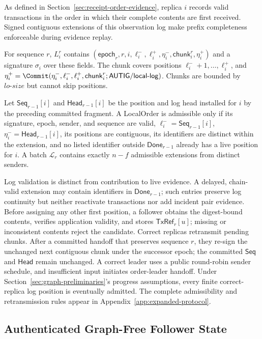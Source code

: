 As defined in Section~\ref{sec:receipt-order-evidence}, replica $i$ records valid transactions in the order in which their complete contents are first received. Signed contiguous extensions of this observation log make prefix completeness enforceable during evidence replay.

For sequence $r$, $L_i^r$ contains $(\mathsf{epoch}_r,r,i,\ell_i^{-},\ell_i^{+},\eta_i^{-},
\mathsf{chunk}_i^r,\eta_i^{+})$ and a signature $\sigma_i$ over these fields. The chunk covers positions $\ell_i^{-}+1,\ldots,\ell_i^{+}$, and $\eta_i^{+}=\Commit(\eta_i^{-},\ell_i^{-},\ell_i^{+}, \mathsf{chunk}_i^r;\mathsf{AUTIG/local\mbox{-}log})$. Chunks are bounded by $lo\text{-}size$ but cannot skip positions.

Let $\mathsf{Seq}_{r-1}[i]$ and $\mathsf{Head}_{r-1}[i]$ be the position and log head installed for $i$ by the preceding committed fragment. A LocalOrder is admissible only if its signature, epoch, sender, and sequence are valid, $\ell_i^{-}=\mathsf{Seq}_{r-1}[i]$, $\eta_i^{-}=\mathsf{Head}_{r-1}[i]$, its positions are contiguous, its identifiers are distinct within the extension, and no listed identifier outside $\mathsf{Done}_{r-1}$ already has a live position for $i$. A batch $\mathcal L_r$ contains exactly $n-f$ admissible extensions from distinct senders.

Log validation is distinct from contribution to live evidence.  A delayed, chain-valid extension may contain identifiers in $\mathsf{Done}_{r-1}$; such entries preserve log continuity but neither reactivate transactions nor add incident pair evidence. Before assigning any other first position, a follower obtains the digest-bound contents, verifies application validity, and stores $\mathsf{TxRef}_r[u]$; missing or inconsistent contents reject the candidate.
Correct replicas retransmit pending chunks.  After a committed handoff that preserves sequence $r$, they re-sign the unchanged next contiguous chunk under the successor epoch; the committed $\mathsf{Seq}$ and $\mathsf{Head}$ remain unchanged. A correct leader uses a public round-robin sender schedule, and insufficient input initiates order-leader handoff. Under Section~\ref{sec:graph-preliminaries}'s progress assumptions, every finite correct-replica log position is eventually admitted. The complete admissibility and retransmission rules appear in Appendix~\ref{app:expanded-protocol}.

\subsection{Authenticated Graph-Free Follower State}
\label{sec:authenticated-evidence-state}

